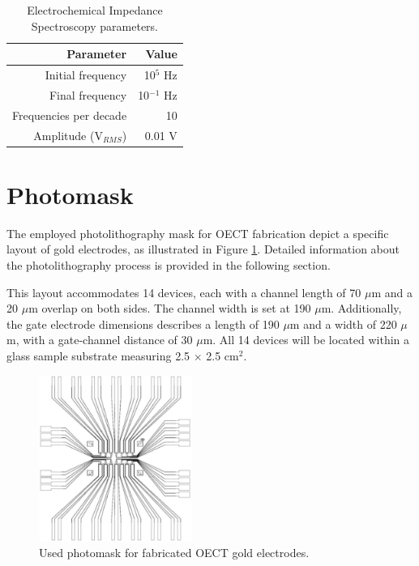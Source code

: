 \begin{itemize}
\begin{table}[ht]
	\centering
	\caption{Electrochemical Impedance Spectroscopy parameters.}
	\begin{tabular}{r r} \hline
		Parameter	& Value \\ \hline
		Initial frequency	& 10$^{5}$ Hz  \\ 
		Final frequency	& 10$^{-1}$ Hz \\ 
		Frequencies per decade	& 10 \\ 
		Amplitude (V$_{RMS}$)	& 0.01 V \\ \hline
	\end{tabular}
	\label{tab:EIS}
\end{table}


\end{itemize}

\section{Photomask}
The employed photolithography mask for OECT fabrication depict a specific layout of gold electrodes, as illustrated in Figure \ref{fig:mask}. Detailed information about the photolithography process is provided in the following section. 

This layout accommodates 14 devices, each with a channel length of 70 $\mu$m and a 20 $\mu$m overlap on both sides. The channel width is set at 190 $\mu$m. Additionally, the gate electrode dimensions describes a length of 190 $\mu$m and a width of 220 $\mu$m, with a gate-channel distance of 30 $\mu$m. All 14 devices will be located within a glass sample substrate measuring 2.5 $\times$ 2.5 cm$^{2}$.

\begin{figure}[ht]
  \centering
  \includegraphics[width=5cm]{Images/pdf/photomask.pdf}
  \caption{Used photomask for fabricated OECT gold electrodes.}
  \label{fig:mask}
\end{figure}

